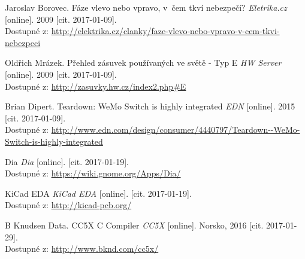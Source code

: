 \documentclass[12pt,a4paper,oneside]{article}
\begin{document}
\begin{thebibliography}{99}
Jaroslav Borovec. Fáze vlevo nebo vpravo, v~čem tkví nebezpečí? \emph{Eletrika.cz} [online]. 2009 [cit. 2017-01-09]. \\ Dostupné z: \url{http://elektrika.cz/clanky/faze-vlevo-nebo-vpravo-v-cem-tkvi-nebezpeci}

Oldřich Mrázek. Přehled zásuvek používaných ve světě - Typ E \emph{HW Server} [online]. 2009 [cit. 2017-01-09]. \\ Dostupné z: \url{http://zasuvky.hw.cz/index2.php#E}

Brian Dipert. Teardown: WeMo Switch is highly integrated \emph{EDN} [online]. 2015 [cit. 2017-01-09]. \\ Dostupné z: \url{http://www.edn.com/design/consumer/4440797/Teardown--WeMo-Switch-is-highly-integrated}

Dia \emph{Dia} [online]. [cit. 2017-01-19]. \\ Dostupné z: \url{https://wiki.gnome.org/Apps/Dia/}

KiCad EDA \emph{KiCad EDA} [online]. [cit. 2017-01-19]. \\ Dostupné z: \url{http://kicad-pcb.org/}

B Knudsen Data. CC5X C Compiler \emph{CC5X} [online]. Norsko, 2016 [cit. 2017-01-29]. \\ Dostupné z: \url{http://www.bknd.com/cc5x/}

\end{thebibliography}

\newpage

\listoffigures


\listoftables

\end{document}
